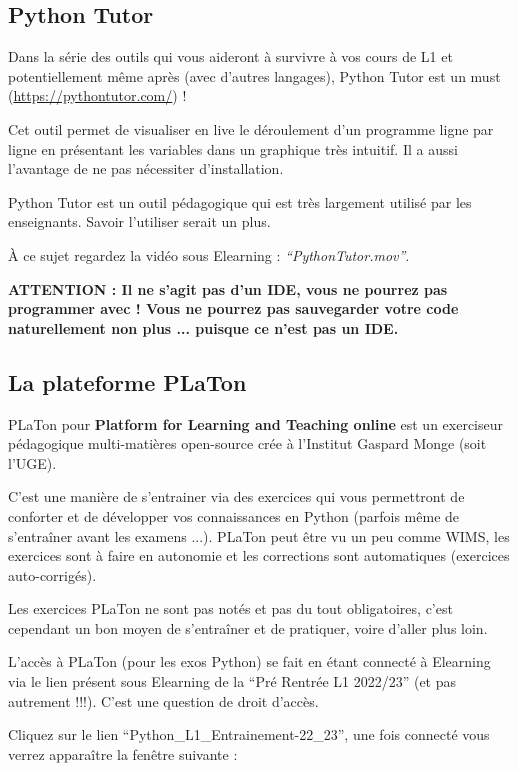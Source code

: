 \documentclass{article}
\begin{document}
\subsection{Python Tutor}

Dans la série des outils qui vous aideront à survivre à vos cours de L1 et potentiellement même après (avec d'autres langages), 
Python Tutor est un must (\url{https://pythontutor.com/}) ! 

Cet outil permet de visualiser en live le déroulement d'un programme ligne par ligne en présentant les variables dans un graphique très intuitif. Il a aussi l'avantage de ne pas nécessiter d'installation. 

Python Tutor est un outil pédagogique qui est très largement utilisé par les enseignants. Savoir l'utiliser serait un plus. 

À ce sujet regardez la vidéo sous Elearning : \emph{``PythonTutor.mov''}.

\textbf{ATTENTION : Il ne s'agit pas d'un IDE, vous ne pourrez pas programmer avec ! Vous ne pourrez pas sauvegarder votre code naturellement non plus ... puisque ce n'est pas un IDE.}

\subsection{La plateforme PLaTon}

PLaTon pour \textbf{Platform for Learning and Teaching online} est un exerciseur pédagogique multi-matières open-source crée à l'Institut Gaspard Monge (soit l'UGE). 

C'est une manière de s'entrainer via des exercices qui vous permettront de conforter et de développer vos connaissances en Python (parfois même de s'entraîner avant les examens ...). PLaTon peut être vu un peu comme WIMS, les exercices sont à faire en autonomie et les corrections sont automatiques (exercices auto-corrigés).

Les exercices PLaTon ne sont pas notés et pas du tout obligatoires, c'est cependant un bon moyen de s'entraîner et de pratiquer, voire d'aller plus loin. 

L'accès à PLaTon (pour les exos Python) se fait en étant connecté à Elearning via le lien présent sous Elearning de la ``Pré Rentrée L1 2022/23'' (et pas autrement !!!). C'est une question de droit d'accès. 

Cliquez sur le lien ``Python\_L1\_Entrainement-22\_23'', une fois connecté vous verrez apparaître la fenêtre suivante : 
\end{document}
